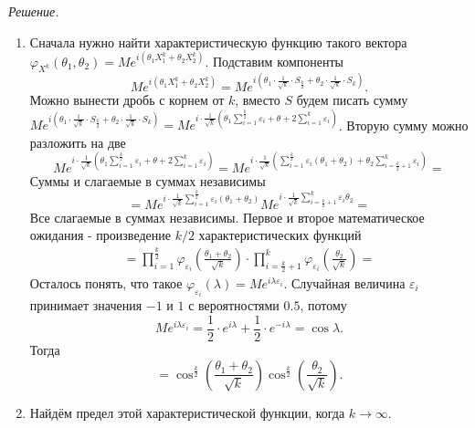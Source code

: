 \textit{Решение.}
\begin{enumerate}[label=\alph*)]
  \item Сначала нужно найти характеристическую функцию такого вектора
  $ \varphi_{X^{k}} \left( \theta_1, \theta_2 \right) =
    Me^{i \left( \theta_1 X_1^k + \theta_2 X_2^k \right) } $.
  Подставим компоненты
  $$Me^{i \left( \theta_1 X_1^k + \theta_2 X_2^k \right) } =
    Me^{i\left(\theta_1\cdot\frac{1}{\sqrt{k}}\cdot S_{\frac{k}{2}}+\theta_2\cdot\frac{1}{\sqrt{k}}\cdot S_k\right)}.$$
  Можно вынести дробь с корнем от $k$, вместо $S$ будем писать сумму
  $Me^{i\left(\theta_1\cdot\frac{1}{\sqrt{k}}\cdot S_{\frac{k}{2}}+\theta_2\cdot\frac{1}{\sqrt{k}}\cdot S_k\right)} =
    Me^{i\cdot\frac{1}{\sqrt{k}}\left(\theta_1\sum\limits_{i=1}^{\frac{k}{2}}\varepsilon_i +\theta+2\sum\limits_{i = 1}^k\varepsilon_i\right)}$.
  Вторую сумму можно разложить на две
  $$Me^{i\cdot\frac{1}{\sqrt{k}}\left(\theta_1\sum\limits_{i=1}^{\frac{k}{2}}\varepsilon_i +\theta+2\sum\limits_{i = 1}^k\varepsilon_i\right)} =
    Me^{i\cdot\frac{1}{\sqrt{k}}\left(\sum\limits_{i=1}^{\frac{k}{2}}\varepsilon_i\left(\theta_1+\theta_2\right)+\theta_2\sum\limits_{i=\frac{k}{2}+1}^k \varepsilon_i\right)} =$$
  Суммы и слагаемые в суммах независимы
  $$= Me^{i\cdot\frac{1}{\sqrt{k}}\sum\limits_{i=1}^{\frac{k}{2}}\varepsilon_i\left(\theta_1+\theta_2\right)}
    Me^{i \cdot \frac{1}{ \sqrt{k}} \sum \limits_{i = \frac{k}{2} + 1}^k \varepsilon_i \theta_2} =$$
  Все слагаемые в суммах независимы.
  Первое и второе математическое ожидания - произведение $k / 2$ характеристических функций
  \begin{gather*}
    = \prod \limits_{i = 1}^{ \frac{k}{2}}
      \varphi_{ \varepsilon_i} \left( \frac{ \theta_1 + \theta_2}{ \sqrt{k}} \right) \cdot
    \prod \limits_{i = \frac{k}{2} + 1}^k
      \varphi_{ \varepsilon_i} \left( \frac{ \theta_2}{ \sqrt{k}} \right) =
    \end{gather*}
  Осталось понять,
  что такое $ \varphi_{ \varepsilon_i} \left( \lambda \right) = Me^{i \lambda \varepsilon_i}$.
  Случайная величина $ \varepsilon_i$ принимает значения $-1$ и $1$ с вероятностями $0.5$, потому
  $$Me^{i \lambda \varepsilon_i} =
    \frac{1}{2} \cdot e^{i \lambda } + \frac{1}{2} \cdot e^{-i \lambda } =
    \cos \lambda.$$
  Тогда
  $$= \cos^{ \frac{k}{2}} \left( \frac{ \theta_1 + \theta_2}{ \sqrt{k}} \right)
    \cos^{ \frac{k}{2}} \left( \frac{ \theta_2}{ \sqrt{k}} \right).$$
  \item Найдём предел этой характеристической функции, когда $k \to \infty $.


\end{enumerate}

